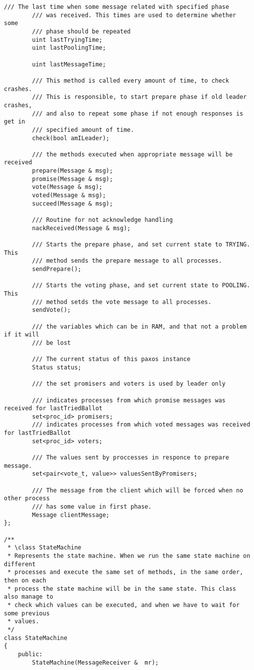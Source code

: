 {\begin{lstlisting}[frame=lines,caption=Pseudocode of Paxos algorithm]
		/// The last time when some message related with specified phase
		/// was received. This times are used to determine whether some 
		/// phase should be repeated
		uint lastTryingTime;
		uint lastPoolingTime;
		
		uint lastMessageTime;
	
		/// This method is called every amount of time, to check crashes.
		/// This is responsible, to start prepare phase if old leader crashes,
		/// and also to repeat some phase if not enough responses is get in 
		/// specified amount of time.
		check(bool amILeader);
	
		/// the methods executed when appropriate message will be received
		prepare(Message & msg);
		promise(Message & msg);
		vote(Message & msg);
		voted(Message & msg);
		succeed(Message & msg);
		
		/// Routine for not acknowledge handling
		nackReceived(Message & msg);
		
		/// Starts the prepare phase, and set current state to TRYING. This 
		/// method sends the prepare message to all processes.
		sendPrepare();
		
		/// Starts the voting phase, and set current state to POOLING. This
		/// method setds the vote message to all processes.
		sendVote();
		
		/// the variables which can be in RAM, and that not a problem if it will
		/// be lost
		
		/// The current status of this paxos instance
		Status status;
		
		/// the set promisers and voters is used by leader only
		
		/// indicates processes from which promise messages was received for lastTriedBallot
		set<proc_id> promisers; 
		/// indicates processes from which voted messages was received for lastTriedBallot
		set<proc_id> voters;
		
		/// The values sent by proccesses in responce to prepare message.
		set<pair<vote_t, value>> valuesSentByPromisers;
		
		/// The message from the client which will be forced when no other process
		/// has some value in first phase.
		Message clientMessage;
};

/**
 * \class StateMachine
 * Represents the state machine. When we run the same state machine on different 
 * processes and execute the same set of methods, in the same order, then on each 
 * process the state machine will be in the same state. This class also manage to
 * check which values can be executed, and when we have to wait for some previous 
 * values.
 */
class StateMachine
{
	public:
		StateMachine(MessageReceiver &  mr);
		

\end{lstlisting}}
